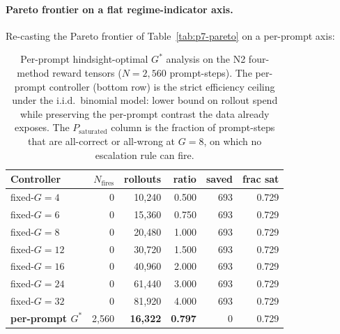 \documentclass{article}
\begin{document}
\paragraph{Pareto frontier on a flat regime-indicator axis.}
Re-casting the Pareto frontier of Table~\ref{tab:p7-pareto} on a
per-prompt axis:

\begin{table}[t]
\centering
\caption{Per-prompt hindsight-optimal $G^*$ analysis on the N2
four-method reward tensors ($N = 2{,}560$ prompt-steps). The
per-prompt controller (bottom row) is the strict efficiency ceiling
under the i.i.d.\ binomial model: lower bound on rollout spend while
preserving the per-prompt contrast the data already exposes.  The
$P_\text{saturated}$ column is the fraction of prompt-steps that are
all-correct or all-wrong at $G=8$, on which no escalation rule can
fire.}
\label{tab:p7-per-prompt-optimal}
\begin{tabular}{lrrrrr}
\toprule
Controller & $N_\text{fires}$ & rollouts & ratio & saved & frac sat \\
\midrule
fixed-$G{=}4$  & 0  & 10{,}240 & 0.500 & 693 & 0.729 \\
fixed-$G{=}6$  & 0  & 15{,}360 & 0.750 & 693 & 0.729 \\
fixed-$G{=}8$  & 0  & 20{,}480 & 1.000 & 693 & 0.729 \\
fixed-$G{=}12$ & 0  & 30{,}720 & 1.500 & 693 & 0.729 \\
fixed-$G{=}16$ & 0  & 40{,}960 & 2.000 & 693 & 0.729 \\
fixed-$G{=}24$ & 0  & 61{,}440 & 3.000 & 693 & 0.729 \\
fixed-$G{=}32$ & 0  & 81{,}920 & 4.000 & 693 & 0.729 \\
\midrule
\textbf{per-prompt $G^*$} & 2{,}560 & \textbf{16{,}322} & \textbf{0.797} & 0 & 0.729 \\
\bottomrule
\end{tabular}
\end{table}
\end{document}
